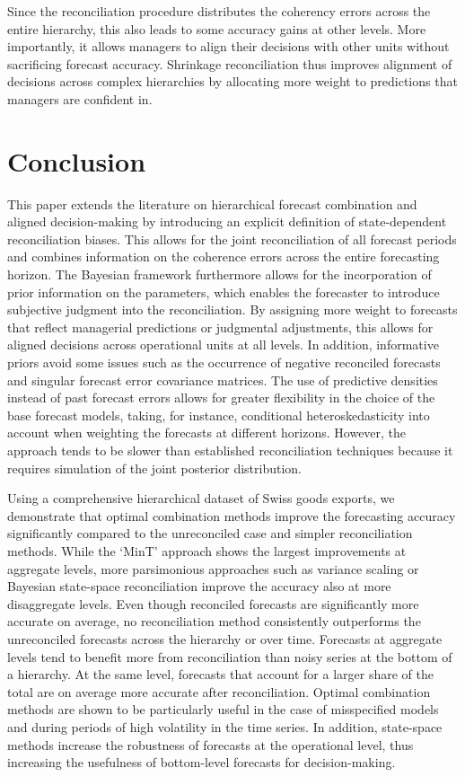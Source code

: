 \documentclass[a4paper,fleqn,11pt]{article}
\begin{document}
Since the reconciliation procedure distributes the coherency errors across the entire hierarchy, this also leads to some accuracy gains at other levels. More importantly, it allows managers to align their decisions with other units without sacrificing forecast accuracy. Shrinkage reconciliation thus improves alignment of decisions across complex hierarchies by allocating more weight to predictions that managers are confident in. 


\section{Conclusion}\label{sec:conc}

This paper extends the literature on hierarchical forecast combination and aligned decision-making by introducing an explicit definition of state-dependent reconciliation biases. This allows for the joint reconciliation of all forecast periods and combines information on the coherence errors across the entire forecasting horizon. The Bayesian framework furthermore allows for the incorporation of prior information on the parameters, which enables the forecaster to introduce subjective judgment into the reconciliation. By assigning more weight to forecasts that reflect managerial predictions or judgmental adjustments, this allows for aligned decisions across operational units at all levels. In addition, informative priors avoid some issues such as the occurrence of negative reconciled forecasts and singular forecast error covariance matrices. The use of predictive densities instead of past forecast errors allows for greater flexibility in the choice of the base forecast models, taking, for instance, conditional heteroskedasticity into account when weighting the forecasts at different horizons. However, the approach tends to be slower than established reconciliation techniques because it requires simulation of the joint posterior distribution.

Using a comprehensive hierarchical dataset of Swiss goods exports, we demonstrate that optimal combination methods improve the forecasting accuracy significantly compared to the unreconciled case and simpler reconciliation methods. While the `MinT' approach shows the largest improvements at aggregate levels, more parsimonious approaches such as variance scaling or Bayesian state-space reconciliation improve the accuracy also at more disaggregate levels. Even though reconciled forecasts are significantly more accurate on average, no reconciliation method consistently outperforms the unreconciled forecasts across the hierarchy or over time. Forecasts at aggregate levels tend to benefit more from reconciliation than noisy series at the bottom of a hierarchy. At the same level, forecasts that account for a larger share of the total are on average more accurate after reconciliation.  Optimal combination methods are shown to be particularly useful in the case of misspecified models and during periods of high volatility in the time series. In addition, state-space methods increase the robustness of forecasts at the operational level, thus increasing the usefulness of bottom-level forecasts for decision-making.




\clearpage


\end{document}
